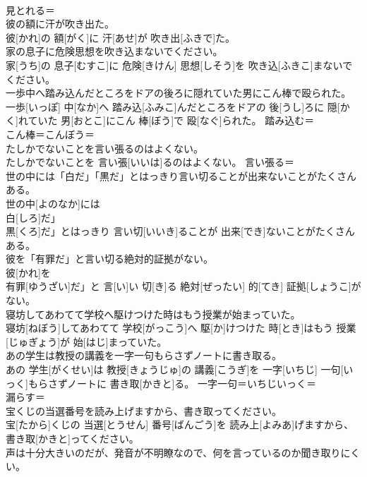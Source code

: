 \documentclass[8pt]{extreport}
\begin{document}
\begin{CJK}{UTF8}{min}
\\	見とれる＝ 
\\	彼の額に汗が吹き出た。	
\\	彼[かれ]の 額[がく]に 汗[あせ]が 吹き出[ふきで]た。	
\\	家の息子に危険思想を吹き込まないでください。	
\\	家[うち]の 息子[むすこ]に 危険[きけん] 思想[しそう]を 吹き込[ふきこ]まないでください。	
\\	一歩中へ踏み込んだところをドアの後ろに隠れていた男にこん棒で殴られた。	
\\	一歩[いっぽ] 中[なか]へ 踏み込[ふみこ]んだところをドアの 後[うし]ろに 隠[かく]れていた 男[おとこ]にこん 棒[ぼう]で 殴[なぐ]られた。	踏み込む＝ 
\\	こん棒＝こんぼう＝ 
\\	たしかでないことを言い張るのはよくない。	
\\	たしかでないことを 言い張[いいは]るのはよくない。	言い張る＝ 
\\	世の中には「白だ」「黒だ」とはっきり言い切ることが出来ないことがたくさんある。	
\\	世の中[よのなか]には
\\	白[しろ]だ」
\\	黒[くろ]だ」とはっきり 言い切[いいき]ることが 出来[でき]ないことがたくさんある。	
\\	彼を「有罪だ」と言い切る絶対的証拠がない。	
\\	彼[かれ]を
\\	有罪[ゆうざい]だ」と 言[い]い 切[き]る 絶対[ぜったい] 的[てき] 証拠[しょうこ]がない。	
\\	寝坊してあわてて学校へ駆けつけた時はもう授業が始まっていた。	
\\	寝坊[ねぼう]してあわてて 学校[がっこう]へ 駆[か]けつけた 時[とき]はもう 授業[じゅぎょう]が 始[はじ]まっていた。	
\\	あの学生は教授の講義を一字一句もらさずノートに書き取る。	
\\	あの 学生[がくせい]は 教授[きょうじゅ]の 講義[こうぎ]を 一字[いちじ] 一句[いっく]もらさずノートに 書き取[かきと]る。	一字一句＝いちじいっく＝ 
\\	漏らす＝ 
\\	宝くじの当選番号を読み上げますから、書き取ってください。	
\\	宝[たから]くじの 当選[とうせん] 番号[ばんごう]を 読み上[よみあ]げますから、 書き取[かきと]ってください。	
\\	声は十分大きいのだが、発音が不明瞭なので、何を言っているのか聞き取りにくい。	

\end{CJK}
\end{document}
